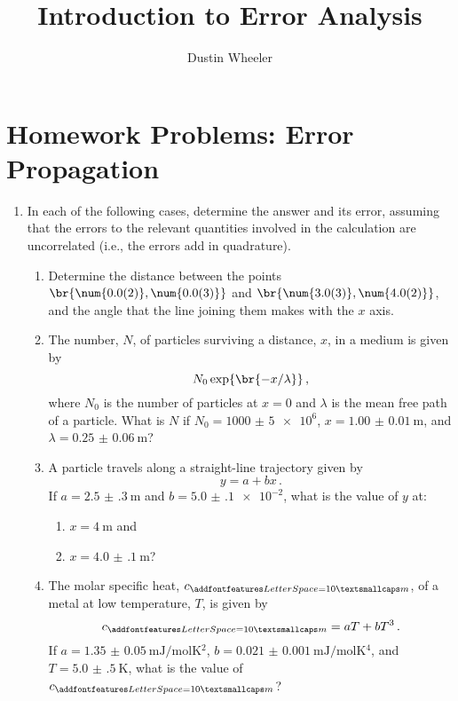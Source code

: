 \documentclass[nobib,nofonts,nols,nohyper]{tufte-handout}
\title{Introduction to Error Analysis}
\author{Dustin Wheeler}
\begin{document}
\maketitle

\section{Homework Problems: Error Propagation} %
\label{sec:homework_problems_error_propagation}

\begin{enumerate}
	\item In each of the following cases, determine the answer and its error, assuming that the errors to the relevant quantities involved in the calculation are uncorrelated (i.e., the errors add in quadrature).
	\begin{enumerate}
		\item Determine the distance between the points \( \br{\num{0.0(2)}, \num{0.0(3)}} \) and \( \br{\num{3.0(3)}, \num{4.0(2)}} \), and the angle that the line joining them makes with the \( x \) axis. 
		\item The number, \( N \), of particles surviving a distance, \( x \), in a medium is given by \[ 
		N_0 \exp\br{-x/\lambda} \, ,
		\] 
		where \( N_0 \) is the number of particles at \( x = 0 \) and \( \lambda \) is the mean free path of a particle. 
		What is \( N \) if \( N_0=\num{1000(5)e6} \), \( x = \SI{1.00(1)}{\m} \), and \( \lambda = \SI{0.25(6)}{\m} \)?
		
		\item A particle travels along a straight-line trajectory given by \[
		 y = a + bx \, .
		 \] 
		If \( a = \SI{2.5(3)}{\m} \) and \( b = \num{5.0(1)e-2} \), what is the value of \( y \) at:
		\begin{enumerate}
			\item \( x = \SI{4}{\m} \) and
			
			\item \( x = \SI{4.0(1)}{\m} \)?
		\end{enumerate}
		
		\item The molar specific heat, \( c_{\textsc{m}} \), of a metal at low temperature, \( T \), is given by \[
			c_{\textsc{m}} = a T + b T^3 \, .
		\]
		If \( a = \SI{1.35(5)}{\mJ\per\mol\K^2} \), \( b = \SI{0.021(1)}{\mJ\per\mol\K^4} \), and \( T = \SI{5.0(5)}{\K} \), what is the value of \( c_{\textsc{m}} \)?
	\end{enumerate}
	

\end{enumerate}
\end{document}
